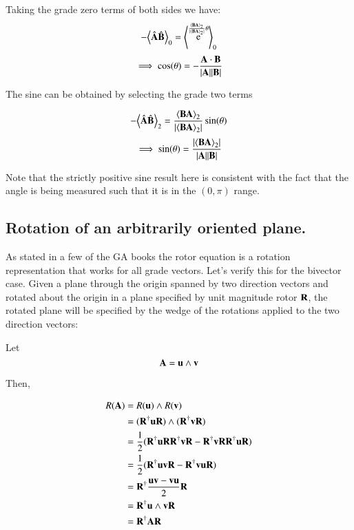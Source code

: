 \documentclass{article}      %
\DeclareMathOperator{\Exp}{e}
\newcommand{\gpgrade}[2] {{\left\langle{{#1}}\right\rangle}_{#2}}
\newcommand{\gpgradezero}[1] {\gpgrade{#1}{0}}
\newcommand{\gpgradetwo}[1] {\gpgrade{#1}{2}}
\begin{document}
Taking the grade zero terms of both sides we have:
\[
-\gpgradezero{\hat{\BA} \hat{\BB}} = \gpgradezero{ \Exp^{ \frac{\gpgradetwo{\BB \BA}}{\abs{\gpgradetwo{\BB \BA}}} \theta} }
\]
\[
\implies
\cos(\theta) = - \frac{\mathbf{A} \cdot \mathbf{B}}{\lvert{\mathbf{A}}\rvert\lvert{\mathbf{B}}\rvert}
\]


The sine can be obtained by selecting the grade two terms

\[
-\gpgradetwo{\hat{\BA} \hat{\BB}} = \frac{\gpgradetwo{\BB \BA}}{\abs{\gpgradetwo{\BB \BA}}} \sin(\theta)
\]
\[
\implies
\sin(\theta) = \frac{\abs{\gpgradetwo{\BB \BA}}}{ \abs{\BA}\abs{\BB} }
\]

Note that the strictly positive sine result here is consistent with the fact that the angle is being measured such that it is in the
$(0,\pi)$ range.

\subsection{ Rotation of an arbitrarily oriented plane. }

As stated in a few of the GA books the rotor equation is a rotation representation that works for all grade vectors.  Let's verify this
for the bivector case.  Given a plane through the origin spanned by two direction vectors and rotated about the origin in a plane specified
by unit magnitude rotor $\mathbf{R}$, the rotated plane will be specified by the wedge of the rotations applied to the two direction vectors:

Let
\[
\mathbf{A} = \mathbf{u} \wedge \mathbf{v}
\]

Then,

\begin{align*}
R(\mathbf{A}) 
&= R(\mathbf{u}) \wedge R(\mathbf{v}) \\
&= (\mathbf{R}^\dagger \mathbf{u} \mathbf{R}) \wedge (\mathbf{R}^\dagger \mathbf{v} \mathbf{R}) \\
&= \frac{1}{2}( \mathbf{R}^\dagger \mathbf{u} \mathbf{R} \mathbf{R}^\dagger \mathbf{v} \mathbf{R} - \mathbf{R}^\dagger \mathbf{v} \mathbf{R} \mathbf{R}^\dagger \mathbf{u} \mathbf{R}) \\
&= \frac{1}{2}( \mathbf{R}^\dagger \mathbf{u} \mathbf{v} \mathbf{R} - \mathbf{R}^\dagger \mathbf{v} \mathbf{u} \mathbf{R}) \\
&= \mathbf{R}^\dagger \frac{\mathbf{u} \mathbf{v} - \mathbf{v} \mathbf{u}}{2} \mathbf{R} \\
&= \mathbf{R}^\dagger \mathbf{u} \wedge \mathbf{v} \mathbf{R} \\
&= \mathbf{R}^\dagger \mathbf{A} \mathbf{R} \\
\end{align*}
\end{document}
